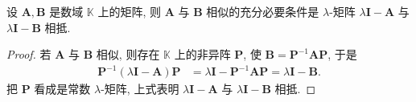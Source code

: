 \documentclass[../../main.tex]{subfiles}%
\begin{document}
\begin{theorem}\label{theorem:矩阵相似的充要条件是对应的lamda-矩阵相抵}
设 $\boldsymbol{A},\boldsymbol{B}$ 是数域 $\mathbb{K}$ 上的矩阵, 则 $\boldsymbol{A}$ 与 $\boldsymbol{B}$ 相似的充分必要条件是 $\lambda$-矩阵 $\lambda\boldsymbol{I}-\boldsymbol{A}$ 与 $\lambda\boldsymbol{I}-\boldsymbol{B}$ 相抵.
\end{theorem}
\begin{proof}
若 $\boldsymbol{A}$ 与 $\boldsymbol{B}$ 相似, 则存在 $\mathbb{K}$ 上的非异阵 $\boldsymbol{P}$, 使 $\boldsymbol{B}=\boldsymbol{P}^{-1}\boldsymbol{A}\boldsymbol{P}$, 于是
\begin{align*}
\boldsymbol{P}^{-1}(\lambda\boldsymbol{I}-\boldsymbol{A})\boldsymbol{P}&=\lambda\boldsymbol{I}-\boldsymbol{P}^{-1}\boldsymbol{A}\boldsymbol{P}=\lambda\boldsymbol{I}-\boldsymbol{B}. 
\end{align*}
把 $\boldsymbol{P}$ 看成是常数 $\lambda$-矩阵, 上式表明 $\lambda\boldsymbol{I}-\boldsymbol{A}$ 与 $\lambda\boldsymbol{I}-\boldsymbol{B}$ 相抵.


\end{proof}
\end{document}
